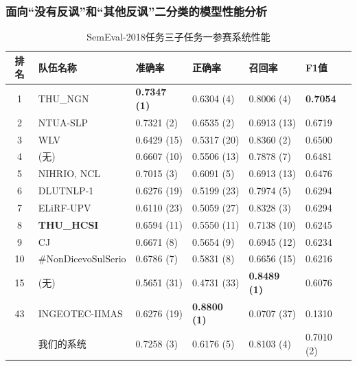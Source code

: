 \subsubsection{面向“没有反讽”和“其他反讽”二分类的模型性能分析}


\begin{table}[htb]
  \centering
  \begin{minipage}[t]{\linewidth}
  \caption{SemEval-2018任务三子任务一参赛系统性能}
  \label{tab:exp_irony_det_A_other_comp}
    \begin{tabularx}{\linewidth}{c|X|llll}
    \toprule[1.5pt]
    排名 & 队伍名称 & 准确率 & 正确率 & 召回率 & F1值 \\
    \hline 
    1 & THU\_NGN & \bf 0.7347 (1) & 0.6304 (4) & 0.8006 (4) & \bf 0.7054 \\
    2 & NTUA-SLP & 0.7321 (2) & 0.6535 (2) & 0.6913 (13) & 0.6719 \\
    3 & WLV & 0.6429 (15) & 0.5317 (20) & 0.8360 (2) & 0.6500 \\
    4 & (无) & 0.6607 (10) & 0.5506 (13) & 0.7878 (7) & 0.6481 \\
    5 & NIHRIO, NCL & 0.7015 (3) & 0.6091 (5) & 0.6913 (13) & 0.6476 \\
    6 & DLUTNLP-1 & 0.6276 (19) & 0.5199 (23) & 0.7974 (5) & 0.6294 \\
    7 & ELiRF-UPV & 0.6110 (23) & 0.5059 (27) & 0.8328 (3) & 0.6294 \\
    8 & \bf THU\_HCSI & 0.6594 (11) & 0.5550 (11) & 0.7138 (10) & 0.6245 \\
    9 & CJ & 0.6671 (8) & 0.5654 (9) & 0.6945 (12) & 0.6234 \\ 
    10 & \#NonDicevoSulSerio & 0.6786 (7) & 0.5831 (8) & 0.6656 (15) & 0.6216 \\
    \hline
    15 & (无) & 0.5651 (31) & 0.4731 (33) & \bf 0.8489 (1) & 0.6076 \\
    \hline
    43 & INGEOTEC-IIMAS & 0.6276 (19) & \bf 0.8800 (1) & 0.0707 (37) & 0.1310 \\
    \hline 
    & 我们的系统 & 0.7258 (3) & 0.6176 (5) & 0.8103 (4) & 0.7010 (2) \\
    \bottomrule[1.5pt]
    \end{tabularx}
  \end{minipage}
\end{table}


